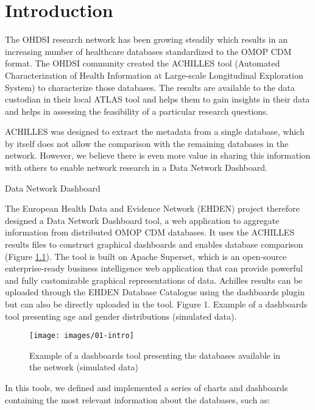 \documentclass[
]{book}
\begin{document}
\hypertarget{introduction}{%
\chapter{Introduction}\label{introduction}}

The OHDSI research network has been growing steadily which results in an increasing number of healthcare databases standardized to the OMOP CDM format. The OHDSI community created the ACHILLES tool (Automated Characterization of Health Information at Large-scale Longitudinal Exploration System) to characterize those databases. The results are available to the data custodian in their local ATLAS tool and helps them to gain insights in their data and helps in assessing the feasibility of a particular research questions.

ACHILLES was designed to extract the metadata from a single database, which by itself does not allow the comparison with the remaining databases in the network. However, we believe there is even more value in sharing this information with others to enable network research in a Data Network Dashboard.

Data Network Dashboard

The European Health Data and Evidence Network (EHDEN) project therefore designed a Data Network Dashboard tool, a web application to aggregate information from distributed OMOP CDM databases. It uses the ACHILLES results files to construct graphical dashboards and enables database comparison (Figure \ref{fig:intro}). The tool is built on Apache Superset, which is an open-source enterprise-ready business intelligence web application that can provide powerful and fully customizable graphical representations of data. Achilles results can be uploaded through the EHDEN Database Catalogue using the dashboards plugin but can also be directly uploaded in the tool. Figure 1. Example of a dashboards tool presenting age and gender distributions (simulated data).

\begin{figure}
\texttt{[image: images/01-intro]} \caption{Example of a dashboards tool presenting the databases available in the network (simulated data)}\label{fig:intro}
\end{figure}

In this tools, we defined and implemented a series of charts and dashboards containing the most relevant information about the databases, such as:
\end{document}
